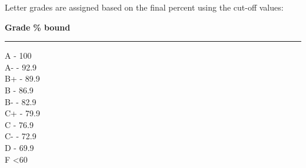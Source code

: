 
Letter grades are assigned based on the final percent using the cut-off values:

\begin{flushleft}
	\textbf{Grade} 		\hfill 		\textbf{\% bound} \\
	\vspace{.1in} \hrule  \vspace{.1in}
	
		A 		 - 100  \\
		A- 		 - 92.9 \\
		B+ 		 - 89.9 \\
		B 		 - 86.9 \\
		B- 		 - 82.9 \\
		C+ 		 - 79.9 \\
		C 		 - 76.9 \\
		C- 		 - 72.9 \\
		D 		 - 69.9 \\
		F 		\dotfill 			<60       \\
\end{flushleft}

